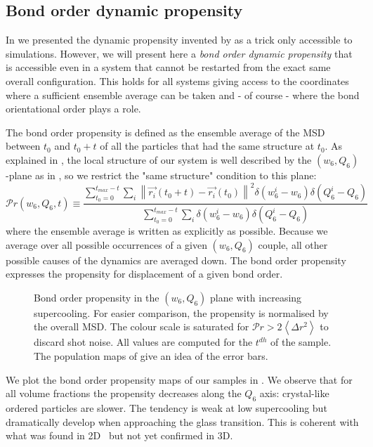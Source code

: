 \subsection{Bond order dynamic propensity}

In  we presented the dynamic propensity invented by \citet{Widmer-Cooper2005} as a trick only accessible to simulations. However, we will present here a \emph{bond order dynamic propensity} that is accessible even in a system that cannot be restarted  from the exact same overall configuration. This holds for all systems giving access to the coordinates where a sufficient ensemble average can be taken and - of course - where the bond orientational order plays a role.

The bond order propensity is defined as the ensemble average of the \ac{MSD} between $t_0$ and $t_0+t$ of all the particles that had the same structure at $t_0$. As explained in , the local structure of our system is well described by the $(w_6,Q_6)$-plane as in , so we restrict the "same structure" condition to this plane:
\begin{equation}
	\mathcal{P}r(w_6, Q_6, t) \equiv \frac{
		\sum\limits_{t_0=0}^{t_{max}-t} \sum\limits_i{
			\left\|\vec{r_i}(t_0+t)-\vec{r_i}(t_0)\right\|^2 \delta(w_6^i-w_6) \delta(Q_6^i-Q_6)
			}
	}{
		\sum\limits_{t_0=0}^{t_{max}-t} \sum\limits_i{ \delta(w_6^i-w_6) \delta(Q_6^i-Q_6)}
	}
	\label{eq:bo_propensity}
\end{equation}
where the ensemble average is written as explicitly as possible. Because we average over all possible occurrences of a given $(w_6, Q_6)$ couple, all other possible causes of the dynamics are averaged down. The bond order propensity expresses the propensity for displacement of a given bond order.

\begin{figure}
	\centering
	\def\svgwidth{\textwidth}
	
	\caption{Bond order propensity in the $(w_6, Q_6)$ plane with increasing supercooling. For easier comparison, the propensity is normalised by the overall \acs{MSD}. The colour scale is saturated for $\mathcal{P}r>2\left\langle \Delta r^2\right\rangle$ to discard shot noise. All values are computed for the $t^{dh}$ of the sample. The population maps of  give an idea of the error bars.}
	\label{fig:msd_w6Q6}
\end{figure}

We plot the bond order propensity maps of our samples in . We observe that for all volume fractions the propensity decreases along the $Q_6$ axis: crystal-like ordered particles are slower. The tendency is weak at low supercooling but dramatically develop when approaching the glass transition. This is coherent with what was found in 2D~\citep{kawasaki2007cbd, watanabe2008} but not yet confirmed in 3D.

